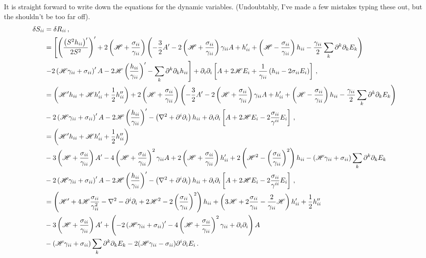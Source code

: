 \documentclass{article}
\newcommand*\scr[1]{\mathscr{#1}}
\newcommand*\p[1]{\left(#1\right)}
\newcommand*\ps[1]{\left[#1\right]}
\newcommand*\f[2]{\frac{#1}{#2}}
\begin{document}
It is straight forward to write down the equations for the dynamic variables. (Undoubtably, I've made a few mistakes typing these out, but the shouldn't be too far off).
\begin{align}
\delta S_{ii}&=\delta R_{ii}\,,\\
\notag&=\ps{\p{\f{\p{S^2h_{ii}}'}{2S^2}}'+2\p{\scr H+\f{\sigma_{ii}}{\gamma_{ii}}}\p{-\f32 A'-2\p{\scr H+\f{\sigma_{ii}}{\gamma_{ii}}}\gamma_{ii}A+h_{ii}'+\p{\scr H-\f{\sigma_{ii}}{\gamma_{ii}}}h_{ii}-\f{\gamma_{ii}}2\sum_k\partial^k\partial_k E_k}\right.\\&\left.-2\p{\scr H\gamma_{ii}+\sigma_{ii}}'A-2\scr H\p{\f{h_{ii}}{\gamma_{ii}}}'-\sum_k\partial^k\partial_k h_{ii}}+\partial_i\partial_i\ps{A+2\scr HE_i+\f1{\gamma_{ii}}\p{h_{ii}-2\sigma_{ii}E_i}}\,,\\
\notag&=\p{\scr H'h_{ii}+\scr Hh_{ii}'+\f12h_{ii}''}+2\p{\scr H+\f{\sigma_{ii}}{\gamma_{ii}}}\p{-\f32 A'-2\p{\scr H+\f{\sigma_{ii}}{\gamma_{ii}}}\gamma_{ii}A+h_{ii}'+\p{\scr H-\f{\sigma_{ii}}{\gamma_{ii}}}h_{ii}-\f{\gamma_{ii}}2\sum_k\partial^k\partial_k E_k}\\&-2\p{\scr H\gamma_{ii}+\sigma_{ii}}'A-2\scr H\p{\f{h_{ii}}{\gamma_{ii}}}'-\p{\nabla^2+\partial^i\partial_i} h_{ii}+\partial_i\partial_i\ps{A+2\scr HE_i-2\f{\sigma_{ii}}{\gamma^{ii}}E_i}\,,\\
\notag&=\p{\scr H'h_{ii}+\scr Hh_{ii}'+\f12h_{ii}''}\\\notag&-3\p{\scr H+\f{\sigma_{ii}}{\gamma_{ii}}} A'-4\p{\scr H+\f{\sigma_{ii}}{\gamma_{ii}}}^2\gamma_{ii}A+2\p{\scr H+\f{\sigma_{ii}}{\gamma_{ii}}}h_{ii}'+2\p{\scr H^2-\p{\f{\sigma_{ii}}{\gamma_{ii}}}^2}h_{ii}-\p{\scr H\gamma_{ii}+\sigma_{ii}}\sum_k\partial^k\partial_k E_k\\&-2\p{\scr H\gamma_{ii}+\sigma_{ii}}'A-2\scr H\p{\f{h_{ii}}{\gamma_{ii}}}'-\p{\nabla^2+\partial^i\partial_i} h_{ii}+\partial_i\partial_i\ps{A+2\scr HE_i-2\f{\sigma_{ii}}{\gamma^{ii}}E_i}\,,\\
\notag&=\p{\scr H'+4\scr H\f{\sigma_{ii}}{\gamma_{ii}^2}-\nabla^2-\partial^i\partial_i+2\scr H^2-2\p{\f{\sigma_{ii}}{\gamma_{ii}}}^2}h_{ii}+\p{3\scr H+2\f{\sigma_{ii}}{\gamma_{ii}}-\f{2}{\gamma_{ii}}\scr H}h_{ii}'+\f12h_{ii}''
\\\notag&-3\p{\scr H+\f{\sigma_{ii}}{\gamma_{ii}}} A'+\p{-2\p{\scr H\gamma_{ii}+\sigma_{ii}}'-4\p{\scr H+\f{\sigma_{ii}}{\gamma_{ii}}}^2\gamma_{ii}+\partial_i\partial_i}A\\&-\p{\scr H\gamma_{ii}+\sigma_{ii}}\sum_k\partial^k\partial_k E_k-2(\scr H\gamma_{ii}-\sigma_{ii})\partial^i\partial_iE_i\,.
\end{align}
\end{document}
